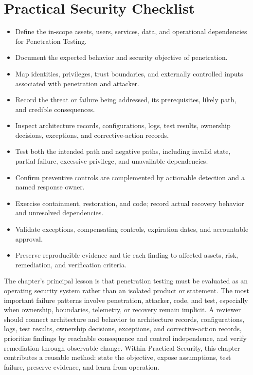\documentclass[11pt]{article}
\begin{document}
\section*{Practical Security Checklist}
\begin{itemize}[label=$\square$]
\item Define the in-scope assets, users, services, data, and operational dependencies for Penetration Testing.
\item Document the expected behavior and security objective of penetration.
\item Map identities, privileges, trust boundaries, and externally controlled inputs associated with penetration and attacker.
\item Record the threat or failure being addressed, its prerequisites, likely path, and credible consequences.
\item Inspect architecture records, configurations, logs, test results, ownership decisions, exceptions, and corrective-action records.
\item Test both the intended path and negative paths, including invalid state, partial failure, excessive privilege, and unavailable dependencies.
\item Confirm preventive controls are complemented by actionable detection and a named response owner.
\item Exercise containment, restoration, and code; record actual recovery behavior and unresolved dependencies.
\item Validate exceptions, compensating controls, expiration dates, and accountable approval.
\item Preserve reproducible evidence and tie each finding to affected assets, risk, remediation, and verification criteria.
\end{itemize}
\begin{synthesisbox}
The chapter's principal lesson is that penetration testing must be evaluated as an operating security system rather than an isolated product or statement. The most important failure patterns involve penetration, attacker, code, and test, especially when ownership, boundaries, telemetry, or recovery remain implicit. A reviewer should connect architecture and behavior to architecture records, configurations, logs, test results, ownership decisions, exceptions, and corrective-action records, prioritize findings by reachable consequence and control independence, and verify remediation through observable change. Within Practical Security, this chapter contributes a reusable method: state the objective, expose assumptions, test failure, preserve evidence, and learn from operation.
\end{synthesisbox}
\end{document}
